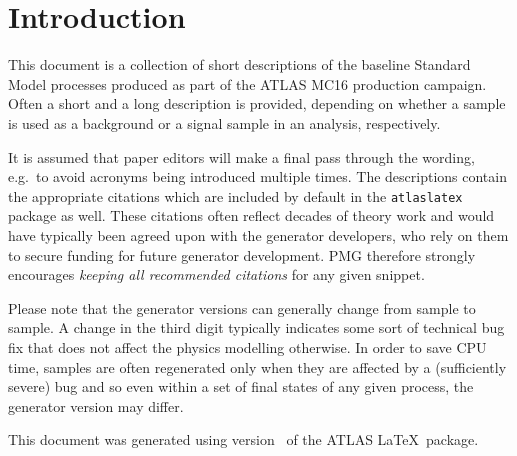 \documentclass[NOTE, UKenglish, texlive=2016]{atlasdoc}
\begin{document}
\maketitle

\tableofcontents

\section{Introduction}

This document is a collection of short descriptions of the baseline Standard Model processes
produced as part of the ATLAS MC16 production campaign. Often a short and a long description 
is provided, depending on whether a sample is used as a background or a signal sample in an
analysis, respectively.

It is assumed that paper editors will make a final pass through the wording, e.g.\ to avoid
acronyms being introduced multiple times.
The descriptions contain the appropriate citations which are included by default in 
the \texttt{atlaslatex} package as well.
These citations often reflect decades of theory work and would have typically been agreed upon 
with the generator developers, who rely on them to secure funding for future generator development.
PMG therefore strongly encourages \emph{keeping all recommended citations} for any given snippet.

Please note that the generator versions can generally change from sample to sample. 
A change in the third digit typically indicates some sort of technical bug fix that
does not affect the physics modelling otherwise. 
In order to save CPU time, samples are often regenerated only when they are affected 
by a (sufficiently severe) bug and so even within a set of final states 
of any given process, the generator version may differ. 

This document was generated using version \ATPackageVersion\ of the ATLAS \LaTeX\ package.

%









\printbibliography
\end{document}
